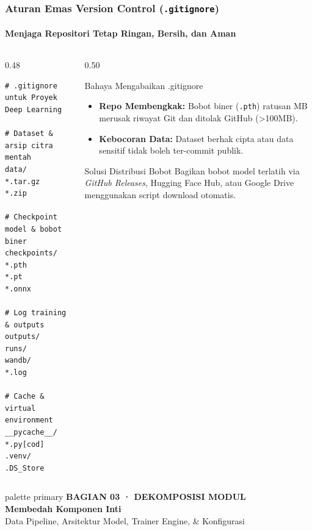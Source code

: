 \documentclass[t,aspectratio=169,xcolor=dvipsnames]{beamer}
\begin{document}
\begin{frame}[fragile]
  \frametitle{Aturan Emas Version Control (\texttt{.gitignore})}
  \framesubtitle{Menjaga Repositori Tetap Ringan, Bersih, dan Aman}

  \begin{columns}[t]
    \begin{column}{0.48\textwidth}
\begin{lstlisting}[style=dirtree]
# .gitignore untuk Proyek Deep Learning

# Dataset & arsip citra mentah
data/
*.tar.gz
*.zip

# Checkpoint model & bobot biner
checkpoints/
*.pth
*.pt
*.onnx

# Log training & outputs
outputs/
runs/
wandb/
*.log

# Cache & virtual environment
__pycache__/
*.py[cod]
.venv/
.DS_Store
\end{lstlisting}
    \end{column}

    \begin{column}{0.50\textwidth}
      \begin{alertblock}{Bahaya Mengabaikan .gitignore}
        \small
        \begin{itemize}\setlength{\itemsep}{2pt}
          \item \textbf{Repo Membengkak:} Bobot biner (\texttt{.pth}) ratusan MB merusak riwayat Git dan ditolak GitHub (>100MB).
          \item \textbf{Kebocoran Data:} Dataset berhak cipta atau data sensitif tidak boleh ter-commit publik.
        \end{itemize}
      \end{alertblock}

      \begin{exampleblock}{Solusi Distribusi Bobot}
        \small
        Bagikan bobot model terlatih via \textit{GitHub Releases}, Hugging Face Hub, atau Google Drive menggunakan script download otomatis.
      \end{exampleblock}
    \end{column}
  \end{columns}
\end{frame}

\begin{frame}[plain]
  \begin{beamercolorbox}[wd=\paperwidth,ht=0.96\paperheight,sep=0.8cm]{palette primary}
    \vspace{1.2cm}
    {\scriptsize\bfseries\color{dlMute}BAGIAN 03 · DEKOMPOSISI MODUL}\\[0.4cm]
    {\Huge\bfseries Membedah Komponen Inti}\\[0.4cm]
    {\small\color{dlHairline}Data Pipeline, Arsitektur Model, Trainer Engine, \& Konfigurasi}
    \vfill
  \end{beamercolorbox}
\end{frame}
\end{document}
